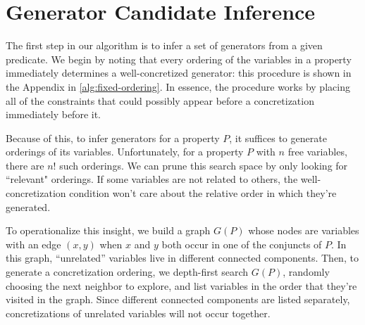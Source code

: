 \documentclass[sigconf,nonacm,review,anonymous]{acmart}
\begin{document}
\section{Generator Candidate Inference}
\label{sec:sci}
The first step in our algorithm is to infer a set of generators from a given
predicate. We begin by noting that every ordering of the variables in a property
immediately determines a well-concretized generator:
this procedure is shown in the Appendix in \autoref{alg:fixed-ordering}.
In essence, the procedure works by placing all of the constraints that could possibly
appear before a concretization immediately before it.

Because of this, to infer generators for a property $P$, it suffices to
generate orderings of its variables. Unfortunately, for a property $P$ with
$n$ free variables, there are $n!$ such orderings.
We can prune this search space by only looking for ``relevant"
orderings. If some variables are not related to others, the well-concretization
condition won't care about the relative order in which they're generated.


To operationalize this insight, we build a graph $G(P)$ whose nodes are variables
with an edge $(x,y)$ when $x$ and $y$ both occur in one of the conjuncts of $P$. In
this graph, ``unrelated'' variables live in different connected components.
Then, to generate a concretization ordering, we depth-first search $G(P)$, randomly
choosing the next neighbor to explore,
and list variables in the order that they're visited in the graph.
Since different connected components are listed separately, concretizations of unrelated variables
will not occur together.

\end{document}
